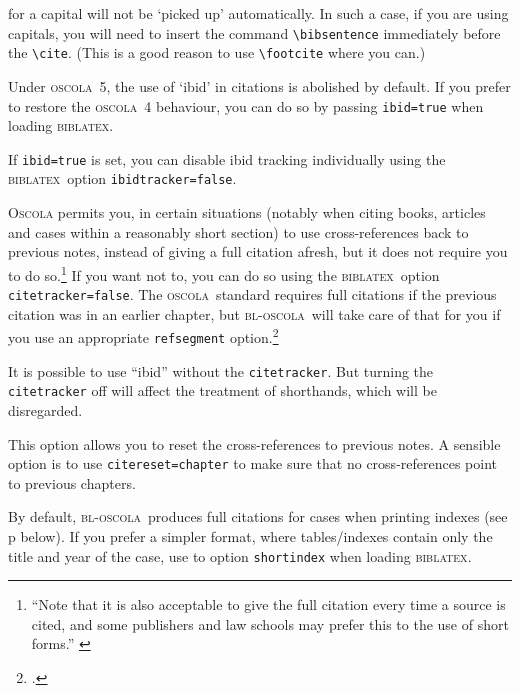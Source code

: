 \documentclass[a4paper,
               11pt,
	       DIV=1,			   
	       footinclude=false]
	      {scrartcl}
\newcommand{\oscola}{\textsc{bl-oscola}}
\newcommand{\biblatex}{\textsc{biblatex}}
\newcommand{\oscolashort}{\textsc{oscola}\nocite{oscola}}
\begin{document}
\begin{description}
  for a capital will not be `picked up' automatically. In such a case,
  if you are using capitals, you will need to insert the command
  \verb|\bibsentence| immediately before the \verb|\cite|. (This is a
  good reason to use \verb|\footcite| where you can.\label{ibidstyle})
\item[\texttt{ibid}] 
   Under \oscolashort\ 5, the use of
  `ibid' in citations is abolished by default. If you prefer to
  restore the \oscolashort\ 4 behaviour, you can do so by passing
  \texttt{ibid=true} when loading \biblatex.
\item[\texttt{ibidtracker}] 
  If \texttt{ibid=true} is set, you can disable ibid tracking
  individually using the \biblatex\ option \texttt{ibidtracker=false}.
\item[\texttt{citetracker}]
                  \textsc{Oscola} permits you, in certain situations (notably
  when citing books, articles and cases within a reasonably short
  section) to use cross-references back to previous notes, instead of
  giving a full citation afresh, but it does not require you to do
  so.\footnote{\enquote{Note that it is also acceptable to give the
      full citation every time a source is cited, and some publishers
      and law schools may prefer this to the use of short forms.}
    \cite[5]{oscola}} If you want not to, you can do so using the
  \biblatex\ option \texttt{citetracker={}false}. The \oscolashort\
  standard requires full citations if the previous citation was
  in an earlier chapter, but \oscola\ will take care of that for
  you if you use an appropriate \texttt{refsegment} option.\footcite[57]{biblatex2}

It is possible to use \enquote{ibid} without the
\verb|citetracker|. But turning the \verb|citetracker| off will affect
the treatment of shorthands, which will be disregarded.
\item[\texttt{citereset}] \index[general]{customization!shortened
    citations}
   This option allows you
  to reset the cross-references to previous notes. A sensible option
  is to use \texttt{citereset={}chapter} to make sure that no
  cross-references point to previous chapters.
\item[shortindex] By default, \oscola\ produces full citations for
  cases when printing indexes (see p \pageref{index:format} below). If
  you prefer a simpler format, where tables\slash indexes contain only
  the title and year of the case, use to option \texttt{shortindex}
  when loading \biblatex.
\end{description}
\end{document}
